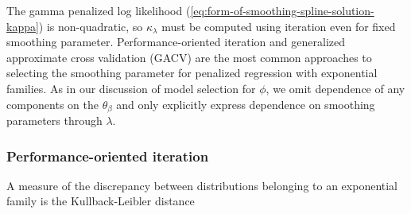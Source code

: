 The gamma penalized log likelihood (\ref{eq:form-of-smoothing-spline-solution-kappa}) is non-quadratic, so $\kappa_\lambda$ must be computed using iteration even for fixed smoothing parameter. Performance-oriented iteration and generalized approximate cross validation (GACV) are the most common approaches to selecting the smoothing parameter for penalized regression with exponential families. As in our discussion of model selection for $\phi$, we omit dependence of any components on the $\theta_\beta$ and only explicitly express dependence on smoothing parameters through $\lambda$.

\subsubsection{Performance-oriented iteration} 

A measure of the discrepancy between distributions belonging to an exponential family is the Kullback-Leibler distance

\begin{equation} \label{eq:}

\end{equation}












